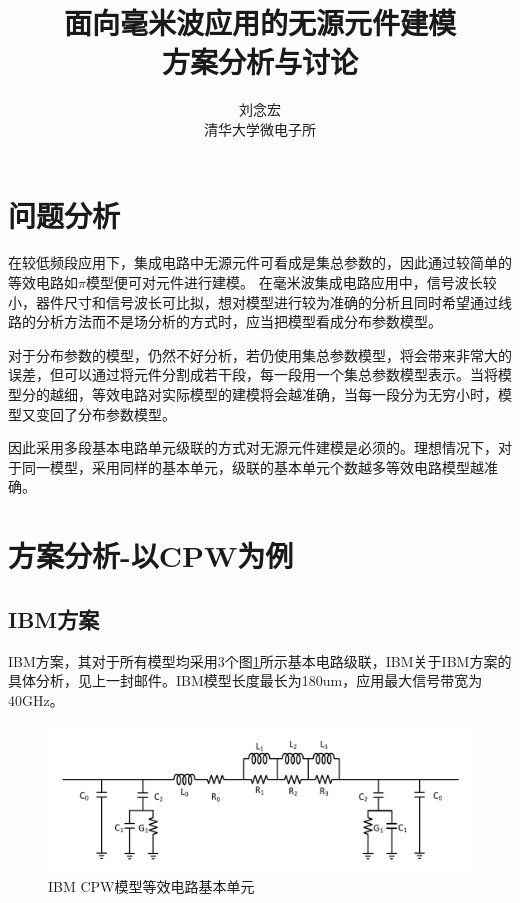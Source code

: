 \documentclass[UTF8,a4paper,zihao=-4]{ctexart}
\begin{document}
\title{面向毫米波应用的无源元件建模\\方案分析与讨论}
\author{刘念宏{} \\清华大学微电子所}
\date{}%
\maketitle

\section{问题分析}
在较低频段应用下，集成电路中无源元件可看成是集总参数的，因此通过较简单的等效电路如$\pi$模型便可对元件进行建模。
在毫米波集成电路应用中，信号波长较小，器件尺寸和信号波长可比拟，想对模型进行较为准确的分析且同时希望通过线路的分析方法而不是场分析的方式时，应当把模型看成分布参数模型。
\par
对于分布参数的模型，仍然不好分析，若仍使用集总参数模型，将会带来非常大的误差，但可以通过将元件分割成若干段，每一段用一个集总参数模型表示。当将模型分的越细，等效电路对实际模型的建模将会越准确，当每一段分为无穷小时，模型又变回了分布参数模型。
\par
因此采用多段基本电路单元级联的方式对无源元件建模是必须的。理想情况下，对于同一模型，采用同样的基本单元，级联的基本单元个数越多等效电路模型越准确。

\section{方案分析-以CPW为例}

\subsection{IBM方案}
IBM方案，其对于所有模型均采用3个图\ref{fig:IBM_model}所示基本电路级联，IBM关于IBM方案的具体分析，见上一封邮件。IBM模型长度最长为180um，应用最大信号带宽为40GHz。
\begin{figure}[htb]
  \centering
  \includegraphics[width=12 cm]{IBM_singlecpw.pdf}
  \caption{IBM CPW模型等效电路基本单元} \label{fig:IBM_model}
\end{figure}
\end{document}
